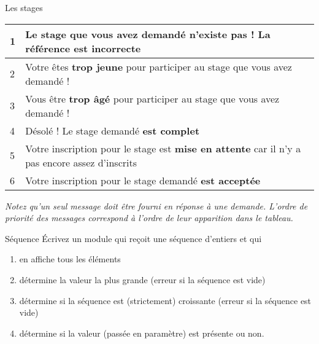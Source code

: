 \begin{Exercice}{Les stages}
	\begin{tabular}{|m{0.36400002cm}|m{13.407001cm}|}
		\hline
		 1 &
		 Le stage que vous avez demandé \textbf{n’existe
		pas} ! La référence est incorrecte\\\hline
		 2 &
		 Votre êtes \textbf{trop jeune} pour participer
		au stage que vous avez demandé !\\\hline
		 3 &
		 Vous être \textbf{trop âgé} pour participer au
		stage que vous avez demandé !\\\hline
		 4 &
		 Désolé ! Le stage demandé \textbf{est complet}\\\hline
		 5 &
		 Votre inscription pour le stage est \textbf{mise
		en attente} car il n’y a pas encore assez d’inscrits\\\hline
		 6 &
		 Votre inscription pour le stage demandé
		\textbf{est acceptée}\\\hline
	\end{tabular}
	
	\textit{Notez qu’un seul message doit être
	fourni en réponse à une demande. L’ordre de priorité des messages
	correspond à l’ordre de leur apparition dans le tableau.}
\end{Exercice}

\begin{Exercice}{Séquence}
	Écrivez un module qui reçoit une séquence d'entiers et
	qui
	\begin{enumerate}
		\item 
			en affiche tous les éléments
		\item 
			détermine la valeur la plus grande (erreur si la séquence est vide)
		\item 
			détermine si la séquence est (strictement) croissante (erreur si la
			séquence est vide)
		\item 
			détermine si la valeur  (passée en paramètre) est
			présente ou non.
	\end{enumerate}
\end{Exercice}

